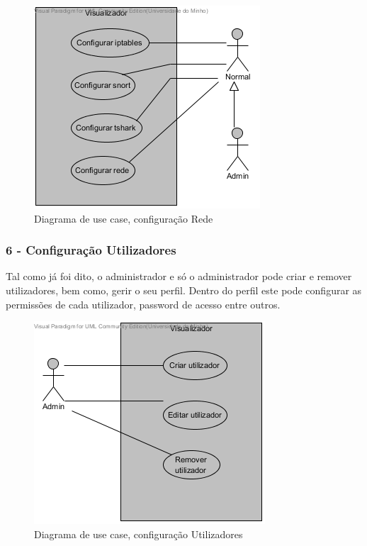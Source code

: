 \begin{figure}[!htb]
	\centering
	\includegraphics[scale=0.80]{images/ucs/ConfRede}
	\caption {Diagrama de use case, configuração Rede}
\end{figure}
\pagebreak

\subsubsection{\textbf{6 - Configuração Utilizadores}}

Tal como já foi dito, o administrador e só o administrador pode criar e remover utilizadores, bem como, gerir o seu perfil. Dentro do perfil este
pode configurar as permissões de cada utilizador, password de acesso entre outros.

\begin{figure}[!htb]
	\centering
	\includegraphics[scale=0.80]{images/ucs/ConfUtilizadores}
	\caption {Diagrama de use case, configuração Utilizadores}
\end{figure}
\pagebreak


